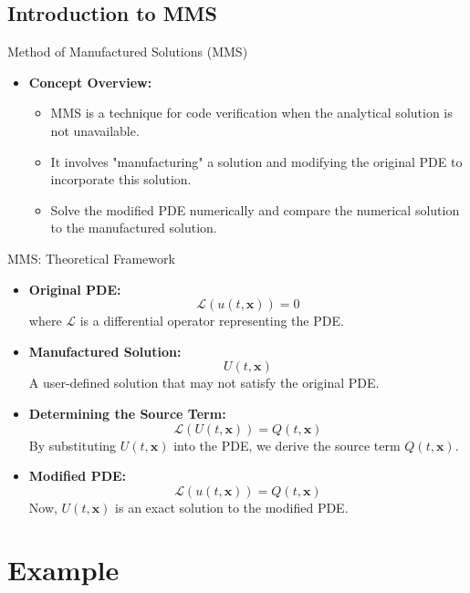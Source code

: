 \documentclass{beamer}
\begin{document}
\subsection{Introduction to MMS}

\begin{frame}{Method of Manufactured Solutions (MMS)}
    \begin{itemize}
        \item \textbf{Concept Overview:}
            \begin{itemize}
                \item MMS is a technique for code verification when the analytical solution is not unavailable.
                \item It involves "manufacturing" a solution and modifying the original PDE to incorporate this solution.
                \item Solve the modified PDE numerically and compare the numerical solution to the manufactured solution.
            \end{itemize}
    \end{itemize}
\end{frame}

\begin{frame}{MMS: Theoretical Framework}
    \begin{itemize}
        \item \textbf{Original PDE:}
            \[
                \mathcal{L}(u(t,\mathbf{x})) = 0
            \]
            where $\mathcal{L}$ is a differential operator representing the PDE.
        \item \textbf{Manufactured Solution:}
            \[
                U(t,\mathbf{x})
            \]
            A user-defined solution that may not satisfy the original PDE.
        \item \textbf{Determining the Source Term:}
            \[
                \mathcal{L}(U(t,\mathbf{x})) = Q(t,\mathbf{x})
            \]
            By substituting $U(t,\mathbf{x})$ into the PDE, we derive the source term $Q(t,\mathbf{x})$.
        \item \textbf{Modified PDE:}
            \[
                \mathcal{L}(u(t,\mathbf{x})) = Q(t,\mathbf{x})
            \]
            Now, $U(t,\mathbf{x})$ is an exact solution to the modified PDE.
    \end{itemize}
\end{frame}

\section{Example}
\end{document}
